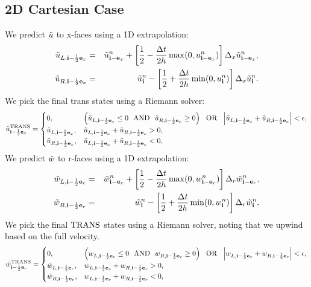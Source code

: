 \subsection{2D Cartesian Case}
We predict $\tilde{u}$ to x-faces using a 1D extrapolation:
\begin{eqnarray}
\tilde{u}_{L,{\bf i}-\frac{1}{2}{\bf e}_x} &=& \tilde{u}_{{\bf i}-{\bf e}_x}^n + \left[\frac{1}{2} - \frac{\Delta t}{2h}\max(0,u_{{\bf i}-{\bf e}_x}^n)\right]\Delta_x \tilde{u}_{{\bf i}-{\bf e}_x}^n,\\
\tilde{u}_{R,{\bf i}-\frac{1}{2}{\bf e}_x} &=& \tilde{u}_{{\bf i}}^n - \left[\frac{1}{2} + \frac{\Delta t}{2h}\min(0,u_{{\bf i}}^n)\right]\Delta_x \tilde{u}_{{\bf i}}^n.
\end{eqnarray}
We pick the final trans states using a Riemann solver:
\begin{equation}
\tilde{u}^{\rm TRANS}_{{\bf i}-\frac{1}{2}{\bf e}_x} =
\begin{cases}
0, & \left(\tilde{u}_{L,{\bf i}-\frac{1}{2}{\bf e}_x} \le 0 ~~ {\rm AND} ~~ \tilde{u}_{R,{\bf i}-\frac{1}{2}{\bf e}_x} \ge 0\right) ~~ {\rm OR} ~~ \left|\tilde{u}_{L,{\bf i}-\frac{1}{2}{\bf e}_x} + \tilde{u}_{R,{\bf i}-\frac{1}{2}{\bf e}_x}\right| < \epsilon, \\
\tilde{u}_{L,{\bf i}-\frac{1}{2}{\bf e}_x}, & \tilde{u}_{L,{\bf i}-\frac{1}{2}{\bf e}_x} + \tilde{u}_{R,{\bf i}-\frac{1}{2}{\bf e}_x} > 0, \\
\tilde{u}_{R,{\bf i}-\frac{1}{2}{\bf e}_x}, & \tilde{u}_{L,{\bf i}-\frac{1}{2}{\bf e}_x} + \tilde{u}_{R,{\bf i}-\frac{1}{2}{\bf e}_x} < 0, \\
\end{cases}
\end{equation}
We predict $\tilde{w}$ to r-faces using a 1D extrapolation:
\begin{eqnarray}
\tilde{w}_{L,{\bf i}-\frac{1}{2}{\bf e}_r} &=& \tilde{w}_{{\bf i}-{\bf e}_r}^n + \left[\frac{1}{2} - \frac{\Delta t}{2h}\max(0,w_{{\bf i}-{\bf e}_r}^n)\right]\Delta_r \tilde{w}_{{\bf i}-{\bf e}_r}^n,\\
\tilde{w}_{R,{\bf i}-\frac{1}{2}{\bf e}_r} &=& \tilde{w}_{{\bf i}}^n - \left[\frac{1}{2} + \frac{\Delta t}{2h}\min(0,w_{{\bf i}}^n)\right]\Delta_r \tilde{w}_{{\bf i}}^n.
\end{eqnarray}
We pick the final $\rm TRANS$ states using a Riemann solver, noting
that we upwind based on the full velocity.
\begin{equation}
\tilde{w}^{\rm TRANS}_{{\bf i}-\frac{1}{2}{\bf e}_r} =
\begin{cases}
0, & \left(w_{L,{\bf i}-\frac{1}{2}{\bf e}_r} \le 0 ~~ {\rm AND} ~~ w_{R,{\bf i}-\frac{1}{2}{\bf e}_r} \ge 0\right) ~~ {\rm OR} ~~ \left|w_{L,{\bf i}-\frac{1}{2}{\bf e}_r} + w_{R,{\bf i}-\frac{1}{2}{\bf e}_r}\right| < \epsilon, \\
\tilde{w}_{L,{\bf i}-\frac{1}{2}{\bf e}_r}, & w_{L,{\bf i}-\frac{1}{2}{\bf e}_r} + w_{R,{\bf i}-\frac{1}{2}{\bf e}_r} > 0, \\
\tilde{w}_{R,{\bf i}-\frac{1}{2}{\bf e}_r}, & w_{L,{\bf i}-\frac{1}{2}{\bf e}_r} + w_{R,{\bf i}-\frac{1}{2}{\bf e}_r} < 0, \\
\end{cases}
\end{equation}

